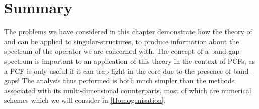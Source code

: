 \section{Summary} \label{sec:GraphSummary}
The problems we have considered in this chapter demonstrate how the theory of  and  can be applied to singular-structures, to produce information about the spectrum of the operator we are concerned with.
The concept of a band-gap spectrum is important to an application of this theory in the context of PCFs, as a PCF is only useful if it can trap light in the core due to the presence of band-gaps!
The analysis thus performed is both much simpler than the methods associated with its multi-dimensional counterparts, most of which are numerical schemes which we will consider in \cref{Homogenisation}. \newline


